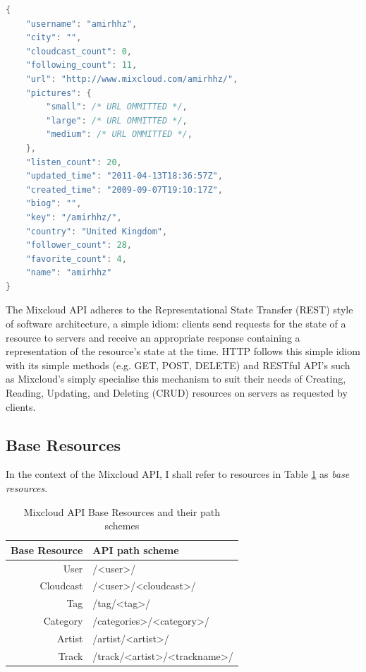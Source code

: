 \documentclass[a4paper,12pt,twoside,notitlepage]{report}
\begin{document}
\begin{lstlisting}[language=Java,caption=Sample response from the Mixcloud API,
label=lst:api-sample]
{
    "username": "amirhhz", 
    "city": "", 
    "cloudcast_count": 0, 
    "following_count": 11, 
    "url": "http://www.mixcloud.com/amirhhz/", 
    "pictures": {
        "small": /* URL OMMITTED */, 
        "large": /* URL OMMITTED */, 
        "medium": /* URL OMMITTED */, 
    }, 
    "listen_count": 20, 
    "updated_time": "2011-04-13T18:36:57Z", 
    "created_time": "2009-09-07T19:10:17Z", 
    "biog": "", 
    "key": "/amirhhz/", 
    "country": "United Kingdom", 
    "follower_count": 28, 
    "favorite_count": 4, 
    "name": "amirhhz"
} 
\end{lstlisting}

The Mixcloud API adheres to the Representational State Transfer (REST)
style of software architecture, a simple idiom: clients send requests for the
state of a resource to servers and receive an appropriate response containing a
representation of the resource's state at the time. HTTP follows this simple
idiom with its simple methods (e.g. GET, POST, DELETE) and RESTful API's such as
Mixcloud's simply specialise this mechanism to suit their needs of Creating,
Reading, Updating, and Deleting (CRUD) resources on servers as requested by
clients.

\subsection{Base Resources}
In the context of the Mixcloud API, I shall refer to resources in Table 
\ref{tab:base-resources} as \emph{base
resources}.


\begin{table}[h]
  \begin{center}
  \begin{tabular}{r >{\ttfamily}l<{\normalfont}}
Base Resource 	& \textnormal{API path scheme} \\
\hline
User 		& /<user>/ \\
Cloudcast	& /<user>/<cloudcast>/ \\
Tag 		& /tag/<tag>/ \\
Category 	& /categories>/<category>/ \\
Artist 		& /artist/<artist>/ \\
Track		& /track/<artist>/<trackname>/ \\

  \end{tabular}
   
  \end{center}
\caption{Mixcloud API Base Resources and their path schemes}
\label{tab:base-resources}
\end{table}
\end{document}
